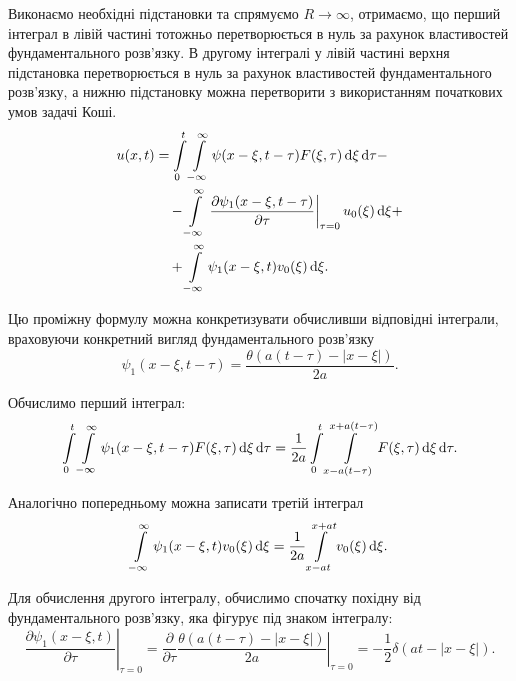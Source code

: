 Виконаємо необхідні підстановки та спрямуємо $R \to \infty$, отримаємо, що перший інтеграл в лівій частині тотожньо перетворюється в нуль за рахунок властивостей фундаментального розв'язку. В другому інтегралі у лівій частині верхня підстановка перетворюється в нуль за рахунок властивостей фундаментального розв'язку, а нижню підстановку можна перетворити з використанням початкових умов задачі Коші.
\begin{equation}
	\begin{aligned}
		u(x, t) &= \displaystyle\int\limits_0^t \displaystyle\int\limits_{-\infty}^\infty \psi(x - \xi, t - \tau) F(\xi, \tau) \mathop{}\!\mathrm{d} \xi \mathop{}\!\mathrm{d} \tau - \\
		& \quad - \displaystyle\int\limits_{-\infty}^\infty \left. \frac{\partial \psi_1(x - \xi, t - \tau)}{\partial \tau} \right|_{\tau = 0} u_0(\xi) \mathop{}\!\mathrm{d} \xi + \\
		& \quad + \displaystyle\int\limits_{-\infty}^\infty \psi_1(x - \xi, t) v_0(\xi) \mathop{}\!\mathrm{d} \xi.
	\end{aligned}
\end{equation}


Цю проміжну формулу можна конкретизувати обчисливши відповідні інтеграли, враховуючи конкретний вигляд фундаментального розв'язку
\begin{equation}
	\psi_1(x - \xi, t - \tau) = \frac{\theta(a(t - \tau) - |x - \xi|)}{2 a}.
\end{equation}

Обчислимо перший інтеграл:
\begin{equation}
	\displaystyle\int\limits_0^t \displaystyle\int\limits_{-\infty}^\infty \psi_1(x - \xi, t - \tau) F(\xi, \tau) \mathop{}\!\mathrm{d} \xi \mathop{}\!\mathrm{d} \tau = \frac{1}{2a} \displaystyle\int\limits_0^t \displaystyle\int\limits_{x - a(t - \tau)}^{x + a(t - \tau)} F(\xi, \tau) \mathop{}\!\mathrm{d} \xi \mathop{}\!\mathrm{d} \tau.
\end{equation}

Аналогічно попередньому можна записати третій інтеграл
\begin{equation}
	\displaystyle\int\limits_{-\infty}^\infty \psi_1(x - \xi, t) v_0(\xi) \mathop{}\!\mathrm{d} \xi = \frac{1}{2a} \displaystyle\int\limits_{x - a t}^{x + a t} v_0(\xi) \mathop{}\!\mathrm{d} \xi.
\end{equation}

Для обчислення другого інтегралу, обчислимо спочатку похідну від фундаментального розв'язку, яка фігурує під знаком інтегралу:
\begin{equation}
	\left. \frac{\partial \psi_1(x - \xi, t)}{\partial \tau} \right|_{\tau = 0} = \frac{\partial}{\partial \tau} \left. \frac{\theta(a(t - \tau) - |x - \xi|)}{2 a} \right|_{\tau = 0} = - \frac{1}{2} \delta(at - |x - \xi|).
\end{equation}


